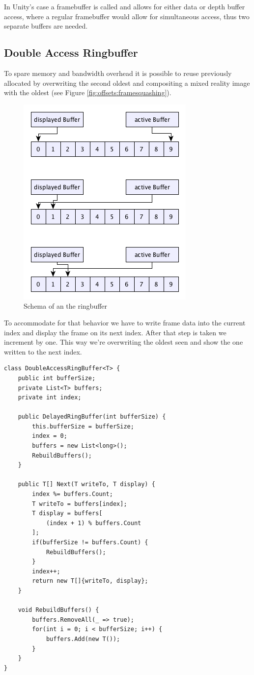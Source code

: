 
In Unity's case a framebuffer is called  and allows 
for either data or depth buffer access, where a regular framebuffer would allow 
for simultaneous access, thus two separate buffers are needed.

\subsection{Double Access Ringbuffer}

To spare memory and bandwidth overhead it is possible to reuse previously 
allocated  by overwriting the second oldest 
 and compositing a mixed reality image with the oldest 
(see  Figure \ref{fig:offsets:framesquashing}).

\begin{figure}[htb]
	\centering
	\includegraphics[width=.5\textwidth]{gfx/ringbuffer_schematics.png}
	\caption{Schema of an the ringbuffer}
	\label{fig:offsets:ringbuffer}
\end{figure}

To accommodate for that behavior we have to write frame data into the current 
index and display the frame on its next index. After that step is taken we 
increment by one. This way we’re overwriting the oldest seen 
 and show the one written to the next index.

\begin{lstlisting}
class DoubleAccessRingBuffer<T> {
	public int bufferSize;
	private List<T> buffers;
	private int index;
	
	public DelayedRingBuffer(int bufferSize) {
		this.bufferSize = bufferSize;
		index = 0;
		buffers = new List<long>();
		RebuildBuffers();
	}
	
	public T[] Next(T writeTo, T display) {
		index %= buffers.Count;
		T writeTo = buffers[index];
		T display = buffers[
			(index + 1) % buffers.Count
		];
		if(bufferSize != buffers.Count) {
			RebuildBuffers();
		}
		index++;
		return new T[]{writeTo, display};
	}
	
	void RebuildBuffers() {
		buffers.RemoveAll(_ => true);
		for(int i = 0; i < bufferSize; i++) {
			buffers.Add(new T());
		}
	}
}
\end{lstlisting}

